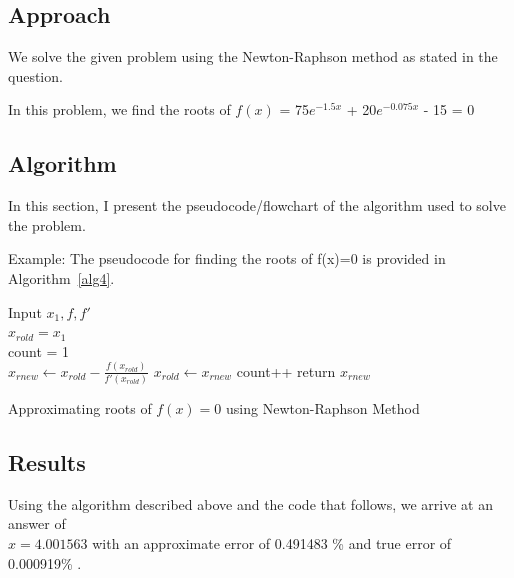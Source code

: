 \documentclass[titlepage, 11pt]{article}
\begin{document}
\subsection{Approach}

We solve the given problem using the Newton-Raphson method as stated in the question. 

In this problem, we find the roots of $f(x)$ = 75$e^{-1.5x}$ + 20$e^{−0.075x}$ - 15 = 0


\subsection{Algorithm}
In this section, I present the pseudocode/flowchart of the algorithm used to solve the problem.

Example: The pseudocode for finding the roots of f(x)=0 is provided in Algorithm~\ref{alg4}.
\begin{centre}

\begin{algorithm}[H]\label{alg4}

\SetAlgoLined

Input $x_1,f,f'$ \\
$x_{rold}=x_1$ \\
count = 1 \\
 {
$x_{rnew} \gets x_{rold} - \frac{f(x_{rold})}{f'(x_{rold})}$ \;
$x_{rold} \gets x_{rnew}$\;
count++ \;
return ${x_{rnew}}$\;
}
 \caption{Approximating roots of $f(x)=0$ using Newton-Raphson Method}
\end{algorithm} 
\end{centre}

\subsection{Results}

Using the algorithm described above and the code that follows, we arrive at an answer of \\ $x = 4.001563$ with an approximate error of 0.491483 \% and true error of 0.000919\% .
\end{document}
